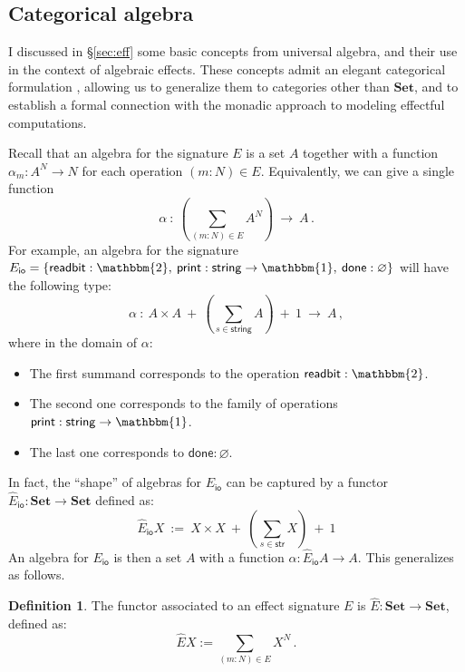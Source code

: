 \documentclass[11pt,oneside,draft]{book}
\theoremstyle{definition}
\newtheorem{definition}[theorem]{Definition}
\newcommand{\kw}[1]{\ensuremath{ \mathsf{#1} }}
\begin{document}

\subsection{Categorical algebra} %

I discussed in \S\ref{sec:eff}
some basic concepts from universal algebra,
and their use in the context of algebraic effects.
These concepts admit
an elegant categorical formulation \citep{freemon},
allowing us to generalize them
to categories other than $\mathbf{Set}$,
and to establish a formal connection with
the monadic approach to modeling effectful computations.

Recall that an algebra for the signature $E$
is a set $A$ together with a function
$\alpha_m : A^N \rightarrow N$ for each operation
$(m \mathbin{:} N) \in E$.
Equivalently, we can give a single function
\[
  \alpha \: : \:
    \left( \sum_{(m \mathbin: N) \in E} A^N \right)
    \: \rightarrow \: A
  \,.
\]
For example,
an algebra for the signature
$E_\kw{io} =
\{ \kw{readbit} : \mathbbm{2}, \:
   \kw{print} : \kw{string} \rightarrow \mathbbm{1}, \:
   \kw{done} : \varnothing \}$
will have the following type:
\[
  \alpha \: : \:
    A \times A \: + \:
    \left( \sum_{s \in \kw{string}} A \right) \: + \:
    1 \: \rightarrow \: A
  \,,
\]
where in the domain of $\alpha$:
\begin{itemize}
  \item
    The first summand corresponds to the operation
    $\kw{readbit} : \mathbbm{2}$.
  \item
    The second one corresponds to the family of operations
    $\kw{print} : \kw{string} \rightarrow \mathbbm{1}$.
  \item
    The last one corresponds to $\kw{done} : \varnothing$.
\end{itemize}
In fact,
the ``shape'' of algebras for $E_\kw{io}$
can be captured by a functor
$\hat{E}_\kw{io} : \mathbf{Set} \rightarrow \mathbf{Set}$
defined as:
\[
  \hat{E}_\kw{io} X \: := \:
    X \times X \: + \:
    \left( \sum_{s \in \kw{str}} X \right) \: + \:
    1
\]
An algebra for $E_\kw{io}$ is then
a set $A$ with a function
$\alpha : \hat{E}_\kw{io} A \rightarrow A$.
This generalizes as follows.

\begin{definition}
The functor associated to an effect signature $E$
is $\hat{E} : \mathbf{Set} \rightarrow \mathbf{Set}$,
defined as:
\[
    \hat{E} X := \sum_{(m : N) \in E} X^N \,.
\]
\end{definition}
\end{document}
